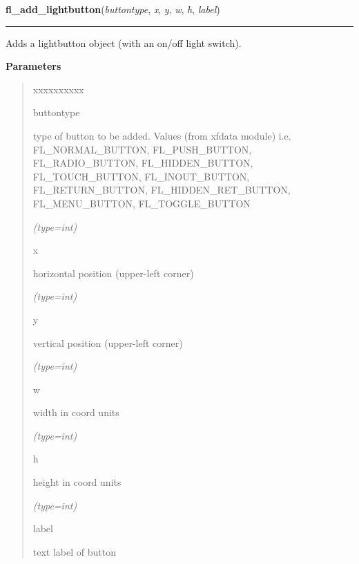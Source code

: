 \hspace{.8\funcindent}\begin{boxedminipage}{\funcwidth}

    \raggedright \textbf{fl\_add\_lightbutton}(\textit{buttontype}, \textit{x}, \textit{y}, \textit{w}, \textit{h}, \textit{label})

    \vspace{-1.5ex}

    \rule{\textwidth}{0.5\fboxrule}
\setlength{\parskip}{2ex}
    Adds a lightbutton object (with an on/off light switch).

\setlength{\parskip}{1ex}
      \textbf{Parameters}
      \vspace{-1ex}

      \begin{quote}
        \begin{Ventry}{xxxxxxxxxx}

          \item[buttontype]

          type of button to be added. Values (from xfdata module) i.e. 
          FL\_NORMAL\_BUTTON, FL\_PUSH\_BUTTON, FL\_RADIO\_BUTTON, 
          FL\_HIDDEN\_BUTTON, FL\_TOUCH\_BUTTON, FL\_INOUT\_BUTTON, 
          FL\_RETURN\_BUTTON, FL\_HIDDEN\_RET\_BUTTON, FL\_MENU\_BUTTON, 
          FL\_TOGGLE\_BUTTON

            {\it (type=int)}

          \item[x]

          horizontal position (upper-left corner)

            {\it (type=int)}

          \item[y]

          vertical position (upper-left corner)

            {\it (type=int)}

          \item[w]

          width in coord units

            {\it (type=int)}

          \item[h]

          height in coord units

            {\it (type=int)}

          \item[label]

          text label of button


\end{Ventry}
\end{quote}
\end{boxedminipage}

